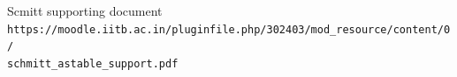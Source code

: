 \documentclass[12pt]{article}
\begin{document}
\vspace{4cm}

    \begin{thebibliography}{9}

        Scmitt supporting document 
        \\\texttt{https://moodle.iitb.ac.in/pluginfile.php/302403/mod\_resource/content/0/\\schmitt\_astable\_support.pdf}
        
    \end{thebibliography}
\end{document}

